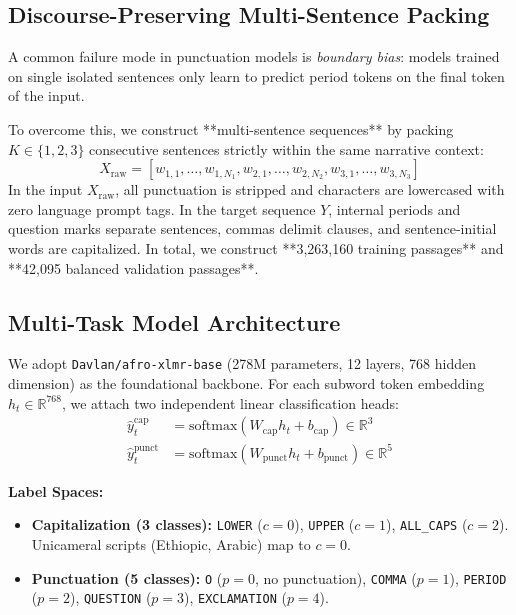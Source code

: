 \documentclass[11pt,a4paper]{article}
\begin{document}
\subsection{Discourse-Preserving Multi-Sentence Packing}
A common failure mode in punctuation models is \textit{boundary bias}: models trained on single isolated sentences only learn to predict period tokens on the final token of the input. 

To overcome this, we construct **multi-sentence sequences** by packing $K \in \{1, 2, 3\}$ consecutive sentences strictly within the same narrative context:
\begin{equation}
    X_{\text{raw}} = [w_{1,1}, \dots, w_{1,N_1}, w_{2,1}, \dots, w_{2,N_2}, w_{3,1}, \dots, w_{3,N_3}]
\end{equation}
In the input $X_{\text{raw}}$, all punctuation is stripped and characters are lowercased with zero language prompt tags. In the target sequence $Y$, internal periods and question marks separate sentences, commas delimit clauses, and sentence-initial words are capitalized. In total, we construct **3,263,160 training passages** and **42,095 balanced validation passages**.

\subsection{Multi-Task Model Architecture}
We adopt \texttt{Davlan/afro-xlmr-base} (278M parameters, 12 layers, 768 hidden dimension) as the foundational backbone. For each subword token embedding $h_t \in \mathbb{R}^{768}$, we attach two independent linear classification heads:
\begin{align}
    \hat{y}_t^{\text{cap}} &= \text{softmax}(W_{\text{cap}} h_t + b_{\text{cap}}) \in \mathbb{R}^3 \\
    \hat{y}_t^{\text{punct}} &= \text{softmax}(W_{\text{punct}} h_t + b_{\text{punct}}) \in \mathbb{R}^5
\end{align}

\noindent \textbf{Label Spaces:}
\begin{itemize}
    \item \textbf{Capitalization (3 classes):} \texttt{LOWER} ($c=0$), \texttt{UPPER} ($c=1$), \texttt{ALL\_CAPS} ($c=2$). Unicameral scripts (Ethiopic, Arabic) map to $c=0$.
    \item \textbf{Punctuation (5 classes):} \texttt{O} ($p=0$, no punctuation), \texttt{COMMA} ($p=1$), \texttt{PERIOD} ($p=2$), \texttt{QUESTION} ($p=3$), \texttt{EXCLAMATION} ($p=4$).
\end{itemize}
\end{document}
